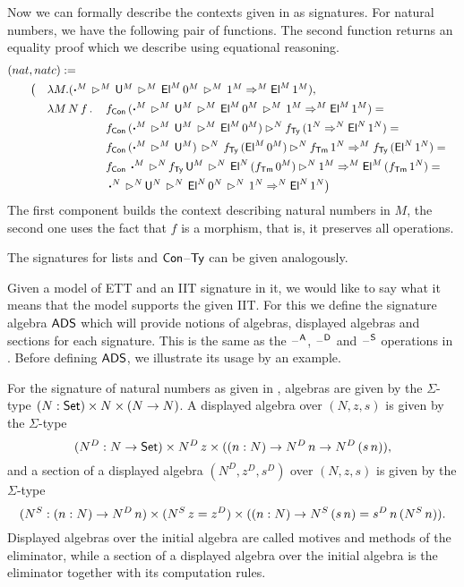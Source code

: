 \documentclass[a4paper,UKenglish,cleveref, autoref]{lipics-v2019}
\begin{document}
\begin{example}\label{ex:signatures}
  Now we can formally describe the contexts given in
   as signatures. For natural numbers, we have the
  following pair of functions. The second function returns an equality
  proof which we describe using equational reasoning.
  \begin{alignat*}{5}
    & \rlap{$(nat,natc) := $} \\
    & \hspace{1em} && \big( && \rlap{$\lambda M.(\boldsymbol{\cdot}^M\,\ext^M\,\U^M\,\ext^M\,\El^M\,0^M\,\ext^M\,1^M \Ra^M \El^M\,1^M),$} \\
    & && && \lambda M\,N\,f\,.\, && f_\Con\,(\boldsymbol{\cdot}^M\,\ext^M\,\U^M\,\ext^M\,\El^M\,0^M\,\ext^M\,1^M \Ra^M \El^M\,1^M) = \\
    & && && && f_\Con\,(\boldsymbol{\cdot}^M\,\ext^M\,\U^M\,\ext^M\,\El^M\,0^M)\ext^N f_\Ty\,(1^N\Ra^N \El^N\,1^N) = \\
    & && && && f_\Con\,(\boldsymbol{\cdot}^M\,\ext^M\,\U^M)\,\ext^N\,f_\Ty\,(\El^M\,0^M)\ext^N f_\Tm\,1^N\Ra^M f_\Ty\,(\El^N\,1^N) = \\
    & && && && f_\Con\,\boldsymbol{\cdot}^M\,\ext^N\,f_\Ty\,\U^M\,\ext^N\,\El^N\,(f_\Tm\,0^M)\ext^N 1^M\Ra^M \El^M\,(f_\Tm\,1^N) = \\
    & && && && \boldsymbol{\cdot}^N\,\ext^N\,\U^N\,\ext^N\,\El^N\,0^N\,\ext^N\,1^N \Ra^N \El^N\,1^N \big)
  \end{alignat*}
  The first component builds the context describing natural numbers in
  $M$, the second one uses the fact that $f$ is a morphism, that is,
  it preserves all operations.

  The signatures for lists and $\mathsf{Con}$--$\mathsf{Ty}$ can be given analogously.
\end{example}

Given a model of ETT and an IIT signature in it, we would like to say
what it means that the model supports the given IIT. For this we
define the signature algebra $\mathsf{ADS}$ which will provide notions of
algebras, displayed algebras and sections for each signature. This is
the same as the $\mathord{\hspace{1pt}\text{--}\hspace{1pt}}^{\mathsf{A}}$, $\mathord{\hspace{1pt}\text{--}\hspace{1pt}}^{\mathsf{D}}$ and $\mathord{\hspace{1pt}\text{--}\hspace{1pt}}^{\mathsf{S}}$ operations in
\cite{Kaposi:2019:CQI:3302515.3290315}. Before defining $\mathsf{ADS}$, we
illustrate its usage by an example.

\begin{example}\label{ex:adsnat}
  For the signature of natural numbers as given in
  , algebras are given by the $\Sigma$-type
  $(N:\mathsf{Set})\times N\times(N\rightarrow N)$. A displayed algebra over $(N,z,s)$
  is given by the $\Sigma$-type
  \[
    (N^D:N\rightarrow\mathsf{Set})\times N^D\,z \times((n:N)\rightarrow N^D\,n\rightarrow N^D\,(s\,n)),
  \]
  and a section of a displayed algebra $(N^D,z^D,s^D)$ over $(N,z,s)$
  is given by the $\Sigma$-type
  \[
    (N^S:(n:N)\rightarrow N^D\,n)\times (N^S\,z = z^D) \times((n:N)\rightarrow N^S\,(s\,n) = s^D\,n\,(N^S\,n)).
  \]
  Displayed algebras over the initial algebra are called motives and
  methods of the eliminator, while a section of a displayed algebra
  over the initial algebra is the eliminator together with its
  computation rules.
\end{example}
  
\end{document}
